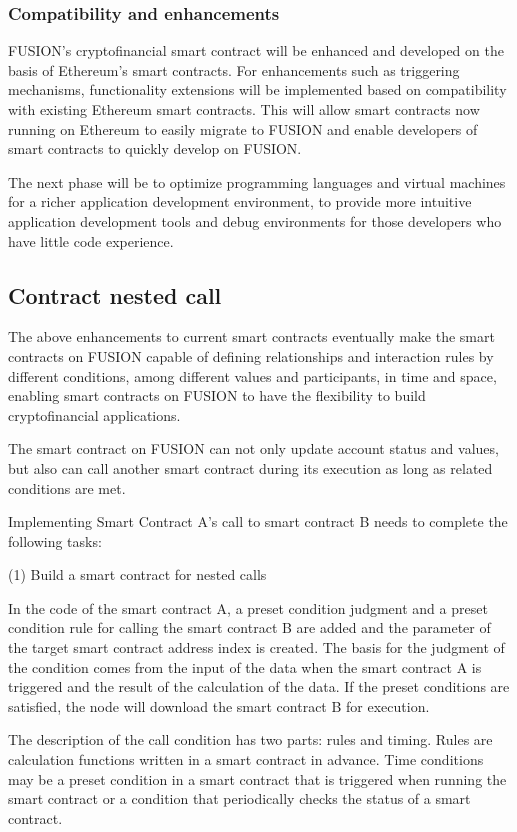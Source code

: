 \documentclass[a4paper,12pt]{article}
\begin{document}
\subsubsection{Compatibility and enhancements}

FUSION's cryptofinancial smart contract will be enhanced and developed on the basis of Ethereum's smart contracts. For enhancements such as triggering mechanisms, functionality extensions will be implemented based on compatibility with existing Ethereum smart contracts. This will allow smart contracts now running on Ethereum to easily migrate to FUSION and enable developers of smart contracts to quickly develop on FUSION.

The next phase will be to optimize programming languages and virtual machines for a richer application development environment, to provide more intuitive application development tools and debug environments for those developers who have little code experience.

\subsection{Contract nested call}

The above enhancements to current smart contracts eventually make the smart contracts on FUSION capable of defining relationships and interaction rules by different conditions, among different values and participants, in time and space, enabling smart contracts on FUSION to have the flexibility to build cryptofinancial applications.

The smart contract on FUSION can not only update account status and values, but also can call another smart contract during its execution as long as related conditions are met.

Implementing Smart Contract A's call to smart contract B needs to complete the following tasks:

(1) Build a smart contract for nested calls

In the code of the smart contract A, a preset condition judgment and a preset condition rule for calling the smart contract B are added and the parameter of the target smart contract address index is created. The basis for the judgment of the condition comes from the input of the data when the smart contract A is triggered and the result of the calculation of the data. If the preset conditions are satisfied, the node will download the smart contract B for execution.

The description of the call condition has two parts: rules and timing. Rules are calculation functions written in a smart contract in advance. Time conditions may be a preset condition in a smart contract that is triggered when running the smart contract or a condition that periodically checks the status of a smart contract.
\end{document}
